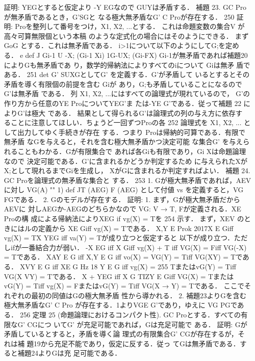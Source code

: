 \documentclass{ltjsarticle}
\theoremstyle{mystyle1}
\theoremstyle{mystyle3}
\theoremstyle{mystyle2}
\begin{document}
証明: YEGとすると仮定より -Y EGなので GU{Y}は矛盾する．
補題 23. GC Proが無矛盾であるとき，G'SGと なる極大無矛盾なG' C Proが存在する．
250
証明: Proを整列して番号をつけ，X1, X2, ...とする． これは命題変数の集合V が高々可算無限個という本稿 のような定式化の場合にはそのようにできる． まずGoG とする．これは無矛盾である． i>1について以下のようにしてG;を定める．
e def J Gi-1 U {-X;} (Gi-1 Xi)
1G-U{X;} (Gi-FX)
Gi-1が無矛盾であれば補題20によりGも無矛盾であ り，数学的帰納法によりすべてのiについて Giは無矛 盾である．
251
det
G' SUXGとしてG' を定義する．G'が矛盾して いるとするとその矛盾を導く有限個の前提を含む Giが あり，G;も矛盾していることになるのでG'は無矛盾 である． 列 X1, X2, ...にはすべての論理式が現れているので， G'の作り方から任意のYE ProについてYEG'ま たは-YE G'である．従って補題 22 によりG'は極大 である．
結果として得られるG'は論理式の列の与え方に依存す ることに注意してほしい．ちょうど一回ずつProの各
252
論理式を X1, X2, ... として出力してゆく手続きが存在 する．つまり Proは帰納的可算である．有限で無矛盾 なGを与えると，それを含む極大無矛盾かつ決定可能 な集合G' を与えられることもわかる．Gが有限集合で あれば各Giも有限であり，Gi Xは命題論理なので 決定可能である．G'に含まれるかどうか判定するため に与えられたXがX;として現れるまでGiを生成し， XがGに含まれるか判定すればよい．
補題 24. GC Proを論理式の無矛盾な集合と
する．
253
1. Gが極大無矛盾であれば，AEVに対し
VG(A) ""
1) def JT (AEG)
F (AEG) として付値 vs を定義すると，VG FGである． 2. Gのモデルが存在する．
証明: 1. まず，Gが極大無矛盾だからAEVに 対しAEGか-AEGのどちらかなので VG: V → {T, F}が定義される．XE Proの構 成による帰納法によりXEG if vg(X) = Tを
254
示す． まず，XEV のときにはルの定義から XE Giff vg(X) = Tである．
X,Y E Prok 2017X E Giff vg(X) = TX YEG iff va(Y) = Tが成り立つと仮定すると 以下が成り立つ．ただしifが一番結合力が弱い． -X EG iff X  Giff vg(X) + T iff VG(X) = Fiff VG(-X) = Tである． XAY E G iff X,Y E G iff vo(X) = VG(Y) = Tiff VG(XY) = Tである． XVY E G iff XE G Hz 18 Y E G iff vg(X) =
255
TまたはvG(Y) = Tiff VG(X VY) = Tである． X + YEG iff X   G TIZY E Giff VG(X) = TまたはvG(Y) = Tiff vg(X) = FまたはvG(Y) = Tiff VG(X → Y) = Tである． ここでそれぞれの最初の同値はGの極大無矛盾 性から導かれる． 2. 補題23よりGを含む極大無矛盾なG' C Pro が存在する．1よりVGE G'であり，ゆえに VG PGである．
256
定理 25 (命題論理におけるコンパクト性). GC Proとする．すべての有限なG' CGにつ いてG' が充足可能であれば，Gは充足可能で ある．
証明: Gが矛盾しているとすると，矛盾を導く論 理式の有限集合G' CGが存在するが，それは補 題19から充足不能であり，仮定に反する．従っ てGは無矛盾である．すると補題24よりGは充 足可能である．
\end{document}
